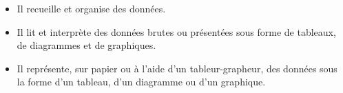 \begin{prerequis}[Objectifs de 5\up{e}]  
    \begin{itemize}  
        \item Il recueille et organise des données.
        \item Il lit et interprète des données brutes ou présentées sous forme de tableaux, de diagrammes et de graphiques.
        \item Il représente, sur papier ou à l’aide d’un tableur-grapheur, des données sous la forme d’un tableau, d’un diagramme ou d’un graphique.
    \end{itemize}
\end{prerequis}
